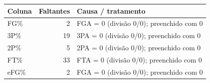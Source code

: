 \begin{tabular}{lrl}
\toprule
Coluna & Faltantes & Causa / tratamento \\
\midrule
FG\% & 2 & FGA = 0 (divisão 0/0); preenchido com 0 \\
3P\% & 19 & 3PA = 0 (divisão 0/0); preenchido com 0 \\
2P\% & 5 & 2PA = 0 (divisão 0/0); preenchido com 0 \\
FT\% & 33 & FTA = 0 (divisão 0/0); preenchido com 0 \\
eFG\% & 2 & FGA = 0 (divisão 0/0); preenchido com 0 \\
\bottomrule
\end{tabular}
